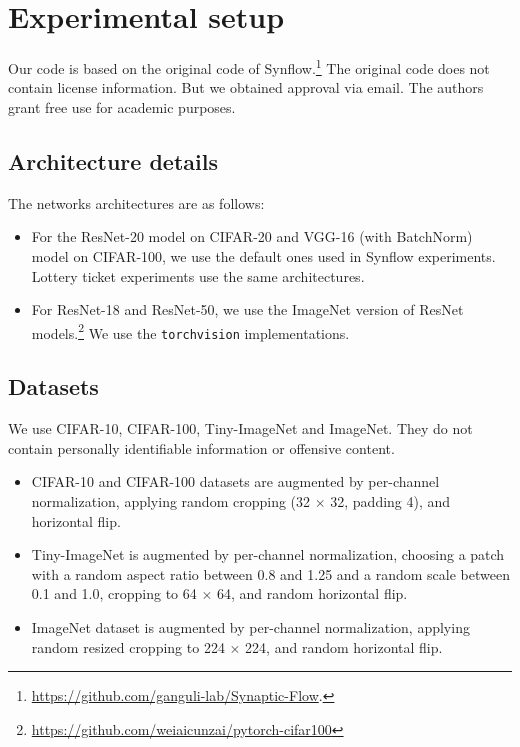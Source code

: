 \documentclass{article} %
\begin{document}
\section{Experimental setup} \label{sect:experiment-setup} 

Our code is based on the original code of Synflow.\footnote{\url{https://github.com/ganguli-lab/Synaptic-Flow}.} The original code does not contain license information. But we obtained approval via email. The authors grant free use for academic purposes.
\subsection{Architecture details} 
The networks architectures are as follows:

\begin{itemize}
    \item For the ResNet-20 model on CIFAR-20 and VGG-16 (with BatchNorm) model on CIFAR-100, we use the default ones used in Synflow \citep{synflow} experiments. Lottery ticket experiments \citep{LTH, LTR, frankle2020linear} use the same architectures.
    \item  For ResNet-18 and ResNet-50, we use the ImageNet version of ResNet models.\footnote{\url{https://github.com/weiaicunzai/pytorch-cifar100}} We use the \texttt{torchvision} implementations.
\end{itemize}

\subsection{Datasets}
We use CIFAR-10, CIFAR-100, Tiny-ImageNet and ImageNet. They do not contain personally identifiable information or offensive content.

\begin{itemize}
    \item CIFAR-10 and CIFAR-100 datasets are augmented by per-channel normalization, applying random cropping (32 $\times$ 32, padding 4), and horizontal flip.
    \item Tiny-ImageNet is augmented by per-channel normalization, choosing a patch with a random aspect ratio between 0.8 and 1.25 and a random scale between 0.1 and 1.0, cropping to 64 $\times$ 64, and random horizontal flip.
    \item  ImageNet dataset is augmented by per-channel normalization, applying random resized cropping to 224 $\times$ 224, and random horizontal flip.
\end{itemize}
\end{document}
